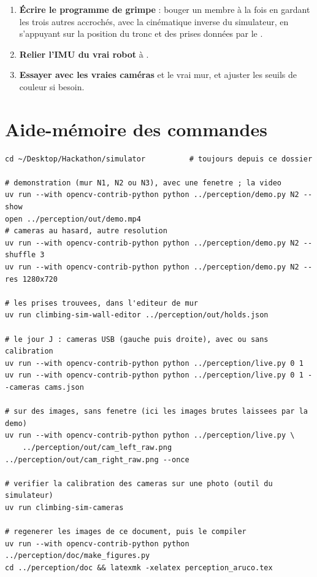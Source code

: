 \documentclass[11pt,a4paper]{article}
\newcommand{\code}[1]{\texttt{\detokenize{#1}}}
\begin{document}
\begin{enumerate}
  \item \textbf{Écrire le programme de grimpe} : bouger un membre à la fois en gardant les trois autres accrochés, avec
        la cinématique inverse du simulateur, en s'appuyant sur la position du tronc et des prises données par le
        \code{Tracker}.
  \item \textbf{Relier l'IMU du vrai robot} à \code{live.py}.
  \item \textbf{Essayer avec les vraies caméras} et le vrai mur, et ajuster les seuils de couleur si besoin.
\end{enumerate}

\appendix
\section{Aide-mémoire des commandes}

\begin{lstlisting}[style=sh]
cd ~/Desktop/Hackathon/simulator          # toujours depuis ce dossier

# demonstration (mur N1, N2 ou N3), avec une fenetre ; la video
uv run --with opencv-contrib-python python ../perception/demo.py N2 --show
open ../perception/out/demo.mp4
# cameras au hasard, autre resolution
uv run --with opencv-contrib-python python ../perception/demo.py N2 --shuffle 3
uv run --with opencv-contrib-python python ../perception/demo.py N2 --res 1280x720

# les prises trouvees, dans l'editeur de mur
uv run climbing-sim-wall-editor ../perception/out/holds.json

# le jour J : cameras USB (gauche puis droite), avec ou sans calibration
uv run --with opencv-contrib-python python ../perception/live.py 0 1
uv run --with opencv-contrib-python python ../perception/live.py 0 1 --cameras cams.json

# sur des images, sans fenetre (ici les images brutes laissees par la demo)
uv run --with opencv-contrib-python python ../perception/live.py \
    ../perception/out/cam_left_raw.png ../perception/out/cam_right_raw.png --once

# verifier la calibration des cameras sur une photo (outil du simulateur)
uv run climbing-sim-cameras

# regenerer les images de ce document, puis le compiler
uv run --with opencv-contrib-python python ../perception/doc/make_figures.py
cd ../perception/doc && latexmk -xelatex perception_aruco.tex
\end{lstlisting}
\end{document}
